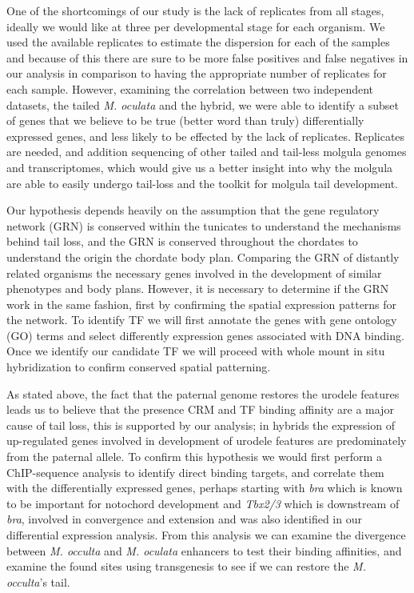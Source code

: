 One of the shortcomings of our study is the lack of replicates from all stages, ideally we would like at three per developmental stage for each organism. We used the available replicates to estimate the dispersion for each of the samples and because of this there are sure to be more false positives and false negatives in our analysis in comparison to having the appropriate number of replicates for each sample. However, examining the correlation between two independent datasets, the tailed \textit{M. oculata} and the hybrid, we were able to identify a subset of genes that we believe to be true (better word than truly) differentially expressed genes, and less likely to be effected by the lack of replicates. Replicates are needed, and addition sequencing of other tailed and tail-less molgula genomes and transcriptomes, which would give us a better insight into why the molgula are able to easily undergo tail-loss and the toolkit for molgula tail development. 

Our hypothesis depends heavily on the assumption that the gene regulatory network (GRN) is conserved within the tunicates to understand the mechanisms behind tail loss, and the GRN is conserved throughout the chordates to understand the origin the chordate body plan. Comparing the GRN of distantly related organisms the necessary genes involved in the development of similar phenotypes and body plans. However, it is necessary to determine if the GRN work in the same fashion, first by confirming the spatial expression patterns for the network. To identify TF we will first annotate the genes with gene ontology (GO) terms and select differently expression genes associated with DNA binding. Once we identify our candidate TF we will proceed with whole mount in situ hybridization to confirm conserved spatial patterning. %

As stated above, the fact that the paternal genome restores the urodele features leads us to believe that the presence CRM and TF binding affinity are a major cause of tail loss, this is supported by our analysis; in hybrids the expression of up-regulated genes involved in development of urodele features are predominately from the paternal allele. To confirm this hypothesis we would first perform a ChIP-sequence analysis to identify direct binding targets, and correlate them with the differentially expressed genes, perhaps starting with \textit{bra} which is known to be important for notochord development and \textit{Tbx2/3} which is downstream of \textit{bra}, involved in convergence and extension and was also identified in our differential expression analysis. From this analysis we can examine the divergence between \textit{M. occulta} and \textit{M. oculata} enhancers to test their binding affinities, and examine the found sites using transgenesis to see if we can restore the \textit{M. occulta}'s tail.

